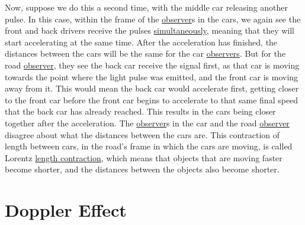 Now, suppose we do this a second time, with the middle car releasing another pulse.
In this case, within the frame of the \hyperlink{def-observer}{observer}s in the cars, we again see the front and back drivers receive the pulses \hyperlink{def-simultaneity}{simultaneously}, meaning that they will start accelerating at the same time.
After the acceleration has finished, the distances between the cars will be the same for the car \hyperlink{def-observer}{observers}.
But for the road \hyperlink{def-observer}{observer}, they see the back car receive the signal first, as that car is moving towards the point where the light pulse was emitted, and the front car is moving away from it.
This would mean the back car would accelerate first, getting closer to the front car before the front car begins to accelerate to that same final speed that the back car has already reached.
This results in the cars being closer together after the acceleration.
The \hyperlink{def-observer}{observer}s in the car and the road \hyperlink{def-observer}{observer} disagree about what the distances between the cars are.
This contraction of length between cars, in the road's frame in which the cars are moving, is called Lorentz \hyperlink{def-length-contraction}{length contraction}, which means that objects that are moving faster become shorter, and the distances between the objects also become shorter.

\section{Doppler Effect} \label{sect: Intro Doppler Effect}

